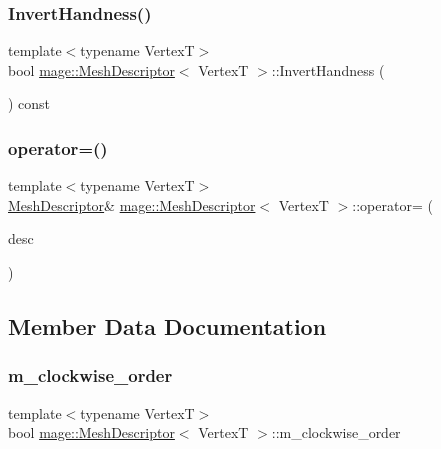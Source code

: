 \subsubsection{\texorpdfstring{Invert\+Handness()}{InvertHandness()}}
{\footnotesize\ttfamily template$<$typename VertexT$>$ \\
bool \hyperlink{structmage_1_1_mesh_descriptor}{mage\+::\+Mesh\+Descriptor}$<$ VertexT $>$\+::Invert\+Handness (\begin{DoxyParamCaption}{ }\end{DoxyParamCaption}) const}

\hypertarget{structmage_1_1_mesh_descriptor_aef6a9568a8d4516dbeff4d8f665ca213}{}\label{structmage_1_1_mesh_descriptor_aef6a9568a8d4516dbeff4d8f665ca213} 
\subsubsection{\texorpdfstring{operator=()}{operator=()}}
{\footnotesize\ttfamily template$<$typename VertexT$>$ \\
\hyperlink{structmage_1_1_mesh_descriptor}{Mesh\+Descriptor}\& \hyperlink{structmage_1_1_mesh_descriptor}{mage\+::\+Mesh\+Descriptor}$<$ VertexT $>$\+::operator= (\begin{DoxyParamCaption}\item[{const \hyperlink{structmage_1_1_mesh_descriptor}{Mesh\+Descriptor}$<$ VertexT $>$ \&}]{desc }\end{DoxyParamCaption})\hspace{0.3cm}{\ttfamily [default]}}



\subsection{Member Data Documentation}
\hypertarget{structmage_1_1_mesh_descriptor_a7e769c8d1d81b3514b951b306865dc88}{}\label{structmage_1_1_mesh_descriptor_a7e769c8d1d81b3514b951b306865dc88} 
\subsubsection{\texorpdfstring{m\+\_\+clockwise\+\_\+order}{m\_clockwise\_order}}
{\footnotesize\ttfamily template$<$typename VertexT$>$ \\
bool \hyperlink{structmage_1_1_mesh_descriptor}{mage\+::\+Mesh\+Descriptor}$<$ VertexT $>$\+::m\+\_\+clockwise\+\_\+order\hspace{0.3cm}{\ttfamily [private]}}

